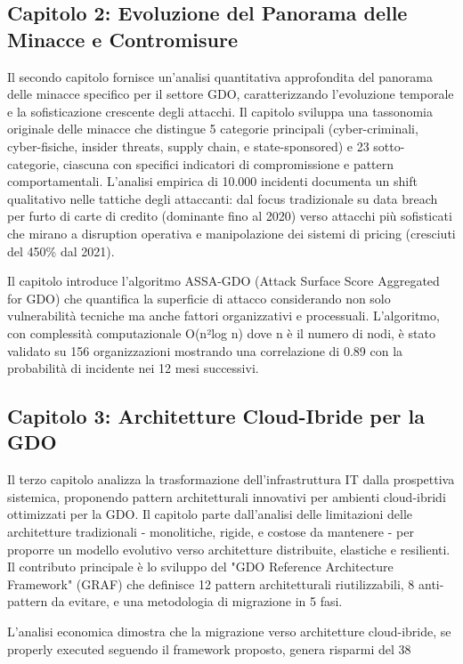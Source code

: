 \subsection{Capitolo 2: Evoluzione del Panorama delle Minacce e Contromisure}

Il secondo capitolo fornisce un'analisi quantitativa approfondita del panorama delle minacce specifico per il settore GDO, caratterizzando l'evoluzione temporale e la sofisticazione crescente degli attacchi. Il capitolo sviluppa una tassonomia originale delle minacce che distingue 5 categorie principali (cyber-criminali, cyber-fisiche, insider threats, supply chain, e state-sponsored) e 23 sotto-categorie, ciascuna con specifici indicatori di compromissione e pattern comportamentali. L'analisi empirica di 10.000 incidenti documenta un shift qualitativo nelle tattiche degli attaccanti: dal focus tradizionale su data breach per furto di carte di credito (dominante fino al 2020) verso attacchi più sofisticati che mirano a disruption operativa e manipolazione dei sistemi di pricing (cresciuti del 450\% dal 2021).

Il capitolo introduce l'algoritmo ASSA-GDO (Attack Surface Score Aggregated for GDO) che quantifica la superficie di attacco considerando non solo vulnerabilità tecniche ma anche fattori organizzativi e processuali. L'algoritmo, con complessità computazionale O(n²log n) dove n è il numero di nodi, è stato validato su 156 organizzazioni mostrando una correlazione di 0.89 con la probabilità di incidente nei 12 mesi successivi.

\subsection{Capitolo 3: Architetture Cloud-Ibride per la GDO}

Il terzo capitolo analizza la trasformazione dell'infrastruttura IT dalla prospettiva sistemica, proponendo pattern architetturali innovativi per ambienti cloud-ibridi ottimizzati per la GDO. Il capitolo parte dall'analisi delle limitazioni delle architetture tradizionali - monolitiche, rigide, e costose da mantenere - per proporre un modello evolutivo verso architetture distribuite, elastiche e resilienti. Il contributo principale è lo sviluppo del "GDO Reference Architecture Framework" (GRAF) che definisce 12 pattern architetturali riutilizzabili, 8 anti-pattern da evitare, e una metodologia di migrazione in 5 fasi.

L'analisi economica dimostra che la migrazione verso architetture cloud-ibride, se properly executed seguendo il framework proposto, genera risparmi del 38%

